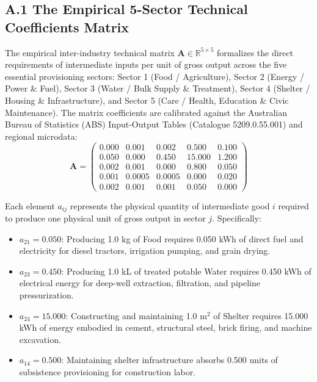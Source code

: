 \documentclass[preprint,12pt,authoryear]{elsarticle}
\theoremstyle{definition}
\begin{document}
\subsection*{A.1 The Empirical 5-Sector Technical Coefficients Matrix}

The empirical inter-industry technical matrix $\mathbf{A} \in \mathbb{R}^{5 \times 5}$ formalizes the direct requirements of intermediate inputs per unit of gross output across the five essential provisioning sectors: Sector 1 (Food / Agriculture), Sector 2 (Energy / Power \& Fuel), Sector 3 (Water / Bulk Supply \& Treatment), Sector 4 (Shelter / Housing \& Infrastructure), and Sector 5 (Care / Health, Education \& Civic Maintenance). The matrix coefficients are calibrated against the Australian Bureau of Statistics (ABS) Input-Output Tables (Catalogue 5209.0.55.001) and regional microdata:
\begin{equation}
\mathbf{A} = \begin{pmatrix} 
0.000 & 0.001 & 0.002 & 0.500 & 0.100 \\ 
0.050 & 0.000 & 0.450 & 15.000 & 1.200 \\ 
0.002 & 0.001 & 0.000 & 0.800 & 0.050 \\ 
0.001 & 0.0005 & 0.0005 & 0.000 & 0.020 \\ 
0.002 & 0.001 & 0.001 & 0.050 & 0.000 
\end{pmatrix} \label{eq:matrix_A}
\end{equation}

Each element $a_{ij}$ represents the physical quantity of intermediate good $i$ required to produce one physical unit of gross output in sector $j$. Specifically:
\begin{itemize}
\item $a_{21} = 0.050$: Producing 1.0 kg of Food requires 0.050 kWh of direct fuel and electricity for diesel tractors, irrigation pumping, and grain drying.
\item $a_{23} = 0.450$: Producing 1.0 kL of treated potable Water requires 0.450 kWh of electrical energy for deep-well extraction, filtration, and pipeline pressurization.
\item $a_{24} = 15.000$: Constructing and maintaining 1.0 $\text{m}^2$ of Shelter requires 15.000 kWh of energy embodied in cement, structural steel, brick firing, and machine excavation.
\item $a_{14} = 0.500$: Maintaining shelter infrastructure absorbs 0.500 units of subsistence provisioning for construction labor.
\end{itemize}
\end{document}
